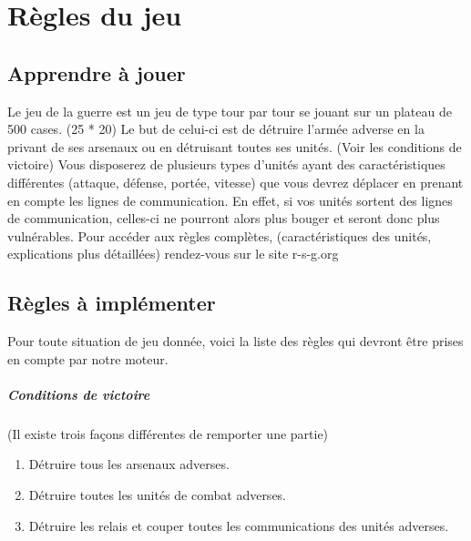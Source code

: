 \chapter{Règles du jeu}

		\section{Apprendre à jouer}
		
		Le jeu de la guerre est un jeu de type tour par tour se jouant sur un plateau de 500 cases. (25 * 20)
		Le but de celui-ci est de détruire l'armée adverse en la privant de ses arsenaux ou en détruisant toutes ses unités. (Voir les conditions de victoire)
		Vous disposerez de plusieurs types d'unités ayant des caractéristiques différentes (attaque, défense, portée, vitesse) que vous devrez déplacer 
		en prenant en compte les lignes de communication.
		En effet, si vos unités sortent des lignes de communication, celles-ci ne pourront alors plus bouger et seront donc plus vulnérables.
		Pour accéder aux règles complètes, (caractéristiques des unités, explications plus détaillées) rendez-vous sur le site r-s-g.org~\cite{ref1}
		
		\section{Règles à implémenter}
		Pour toute situation de jeu donnée, voici la liste des règles qui devront être prises en compte par notre moteur.

		\paragraph{Conditions de victoire}
                 (Il existe trois façons différentes de remporter une partie)
		\begin{enumerate}
		\item Détruire tous les arsenaux adverses.
		\item Détruire toutes les unités de combat adverses.
		\item Détruire les relais et couper toutes les communications des unités adverses.
		\end{enumerate}
		
